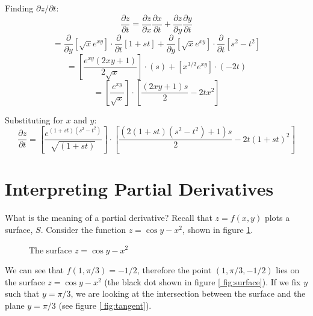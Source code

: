 \begin{Answer}[ref = chain]
\begin{enumerate}
    Finding $\partial z / \partial t$:
    $$\frac{\partial z}{\partial t} = \frac{\partial z}{\partial x} \frac{
    \partial x}{\partial t} + \frac{\partial z}{\partial y}\frac{\partial y}{
    \partial t}$$
    $$= \frac{\partial}{\partial y} \left[ \sqrt{x}e^{xy} \right] \cdot \frac{
    \partial}{\partial t} \left[ 1 + st \right] + \frac{\partial}{\partial y} 
    \left[ \sqrt{x}e^{xy} \right] \cdot \frac{\partial}{\partial t} \left[ s^2 
    - t^2 \right]$$
    $$= \left[ \frac{e^{xy} \left( 2xy + 1 \right)}{2\sqrt{x}} \right] \cdot 
    \left( s \right) + \left[ x^{3/2}e^{xy} \right] \cdot \left( -2t \right)$$
    $$= \left[ \frac{e^{xy}}{\sqrt{x}} \right] \cdot \left[ \frac{\left( 2xy + 
    1 \right)s}{2} - 2tx^2 \right]$$

    Substituting for $x$ and $y$:
    $$\frac{\partial z}{\partial t} = \left[ \frac{e^{\left( 1 + st \right) 
    \left( s^2 - t^2 \right)}}{\sqrt{\left( 1 + st \right)}} \right] \cdot 
    \left[ \frac{\left( 2\left( 1 + st \right) \left( s^2 - t^2 \right) + 1 
    \right)s}{2} - 2t \left( 1 + st \right)^2 \right]$$
\end{enumerate}
\end{Answer}

\section{Interpreting Partial Derivatives}
What is the meaning of a partial derivative? Recall that $z = f(x, y)$ plots a 
surface, $S$. Consider the function $z = \cos{y} - x^2$, shown in figure 
\ref{fig:surface}.

\begin{figure}[htbp]
    \centering
    \caption{The surface $z = \cos{y} - x^2$}
    \label{fig:surface}
\end{figure}

We can see that $f(1, \pi/3) = -1/2$, therefore the point $(1, \pi/3, -1/2)$ 
lies on the surface $z = \cos{y} - x^2$ (the black dot shown in figure \ref{
fig:surface}). If we fix $y$ such that $y = \pi/3$, we are looking at the 
intersection between the surface and the plane $y = \pi/3$ (see figure \ref{
fig:tangent}). 


